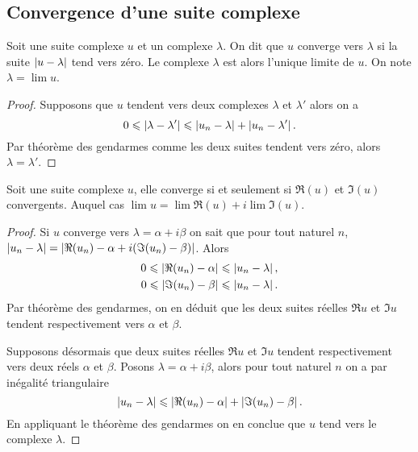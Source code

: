 \subsection{Convergence d'une suite complexe}

\begin{defdef}
  Soit une suite complexe $u$ et un complexe $\lambda$. On dit que $u$ converge vers $\lambda$ si la suite $\left\lvert u-\lambda\right\rvert$ tend vers zéro. Le complexe $\lambda$ est alors l'unique limite de $u$. On note $\lambda = \lim u$.
\end{defdef}
\begin{proof}
  Supposons que $u$ tendent vers deux complexes $\lambda$ et $\lambda'$ alors on a
  \begin{equation}
    0 \leqslant \left\lvert\lambda - \lambda'\right\rvert \leqslant \left\lvert u_n-\lambda\right\rvert + \left\lvert u_n-\lambda'\right\rvert.
  \end{equation}
Par théorème des gendarmes comme les deux suites tendent vers zéro, alors $\lambda=\lambda'$.
\end{proof}

\begin{prop}
  Soit une suite complexe $u$, elle converge si et seulement si $\Re(u)$ et $\Im(u)$ convergents. Auquel cas $\lim u = \lim \Re(u) + i \lim \Im(u)$.
\end{prop}
\begin{proof}
  Si $u$ converge vers $\lambda=\alpha+ i \beta$ on sait que pour tout naturel $n$, $\left\lvert u_n-\lambda\right\rvert=\left\lvert\Re(u_n)-\alpha + i(\Im(u_n)-\beta)\right\rvert$. Alors
  \begin{align}
    0 \leqslant \left\lvert\Re(u_n) -\alpha\right\rvert \leqslant \left\lvert u_n-\lambda\right\rvert, \\ 
    0 \leqslant \left\lvert\Im(u_n) -\beta\right\rvert \leqslant \left\lvert u_n-\lambda\right\rvert.
  \end{align}
  Par théorème des gendarmes, on en déduit que les deux suites réelles $\Re u$ et $\Im u$ tendent respectivement vers $\alpha$ et $\beta$.

  Supposons désormais que deux suites réelles $\Re u$ et $\Im u$ tendent respectivement vers deux réels $\alpha$ et $\beta$. Posons $\lambda = \alpha + i \beta$, alors pour tout naturel $n$ on a par inégalité triangulaire
\begin{equation}
  \left\lvert u_n-\lambda\right\rvert \leqslant \left\lvert\Re(u_n) - \alpha\right\rvert + \left\lvert\Im(u_n) - \beta\right\rvert.
\end{equation}
En appliquant le théorème des gendarmes on en conclue que $u$ tend vers le complexe $\lambda$.
\end{proof}


